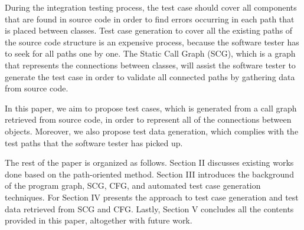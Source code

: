 During the integration testing process, the test case should cover all 
components that are found in source code in order to find errors occurring 
in each path that is placed between classes. Test case generation 
to cover all the existing paths of the source code structure 
is an expensive process, because the software tester has to seek 
for all paths one by one. The Static Call Graph (SCG), which is a graph 
that represents the connections between classes, will assist the 
software tester to generate the test case in order to validate 
all connected paths by gathering data from source code.

In this paper, we aim to propose test cases, which is generated 
from a call graph retrieved from source code, in order to 
represent all of the connections between objects. Moreover, 
we also propose test data generation, which complies with the test 
paths that the software tester has picked up.

The rest of the paper is organized as follows. Section II discusses 
existing works done based on the path-oriented method. 
Section III introduces the background of the program graph, SCG, CFG, 
and automated test case generation techniques. 
For Section IV presents the approach to test case generation 
and test data retrieved from SCG and CFG. Lastly, Section V 
concludes all the contents provided in this paper, altogether with future work.

